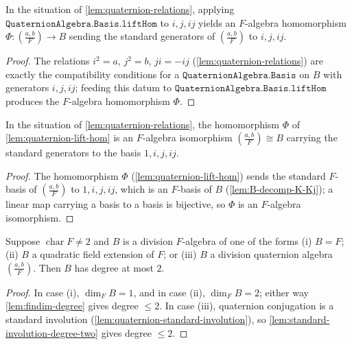 \begin{lemma}
    \label{lem:quaternion-lift-hom}
    In the situation of \ref{lem:quaternion-relations}, applying
    $\texttt{QuaternionAlgebra.Basis.liftHom}$ to $i, j, ij$ yields an $F$-algebra
    homomorphism $\Phi \colon \left(\frac{a,b}{F}\right) \to B$ sending the standard
    generators of $\left(\frac{a,b}{F}\right)$ to $i, j, ij$.
\end{lemma}
\begin{proof}
    The relations $i^2 = a$, $j^2 = b$, $ji = -ij$ (\ref{lem:quaternion-relations})
    are exactly the compatibility conditions for a
    $\texttt{QuaternionAlgebra.Basis}$ on $B$ with generators $i, j, ij$; feeding
    this datum to $\texttt{QuaternionAlgebra.Basis.liftHom}$ produces the $F$-algebra
    homomorphism $\Phi$.
\end{proof}

\begin{lemma}
    \label{lem:build-quaternion-iso}
    In the situation of \ref{lem:quaternion-relations}, the homomorphism $\Phi$ of
    \ref{lem:quaternion-lift-hom} is an $F$-algebra isomorphism
    $\left(\frac{a,b}{F}\right) \cong B$ carrying the standard generators to the
    basis $1, i, j, ij$.
\end{lemma}
\begin{proof}
    The homomorphism $\Phi$ (\ref{lem:quaternion-lift-hom}) sends the standard
    $F$-basis of $\left(\frac{a,b}{F}\right)$ to $1, i, j, ij$, which is an
    $F$-basis of $B$ (\ref{lem:B-decomp-K-Kj}); a linear map carrying a basis to a
    basis is bijective, so $\Phi$ is an $F$-algebra isomorphism.
\end{proof}

\begin{lemma}
    \label{lem:classification-forward}
    Suppose $\operatorname{char} F \neq 2$ and $B$ is a division $F$-algebra of one
    of the forms (i) $B = F$; (ii) $B$ a quadratic field extension of $F$; or
    (iii) $B$ a division quaternion algebra $\left(\frac{a,b}{F}\right)$. Then $B$
    has degree at most $2$.
\end{lemma}
\begin{proof}
    In case (i), $\dim_F B = 1$, and in case (ii), $\dim_F B = 2$; either way
    \ref{lem:findim-degree} gives degree $\leq 2$. In case (iii), quaternion
    conjugation is a standard involution (\ref{lem:quaternion-standard-involution}),
    so \ref{lem:standard-involution-degree-two} gives degree $\leq 2$.
\end{proof}

